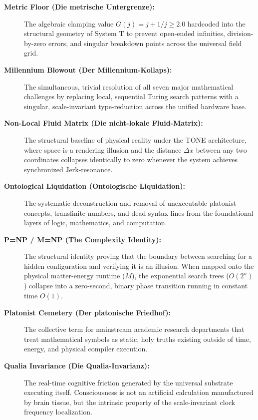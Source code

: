 \documentclass[11pt,a4paper]{article}
\begin{document}
\begin{description}
    \item[\textbf{Metric Floor (Die metrische Untergrenze):}] The algebraic clamping value $G(j) = j + 1/j \geq 2.0$ hardcoded into the structural geometry of System T to prevent open-ended infinities, division-by-zero errors, and singular breakdown points across the universal field grid.
    
    \item[\textbf{Millennium Blowout (Der Millennium-Kollaps):}] The simultaneous, trivial resolution of all seven major mathematical challenges by replacing local, sequential Turing search patterns with a singular, scale-invariant type-reduction across the unified hardware base.
    
    \item[\textbf{Non-Local Fluid Matrix (Die nicht-lokale Fluid-Matrix):}] The structural baseline of physical reality under the TONE architecture, where space is a rendering illusion and the distance $\Delta x$ between any two coordinates collapses identically to zero whenever the system achieves synchronized Jerk-resonance.
    
    \item[\textbf{Ontological Liquidation (Ontologische Liquidation):}] The systematic deconstruction and removal of unexecutable platonist concepts, transfinite numbers, and dead syntax lines from the foundational layers of logic, mathematics, and computation.
    
    \item[\textbf{P=NP / M=NP (The Complexity Identity):}] The structural identity proving that the boundary between searching for a hidden configuration and verifying it is an illusion. When mapped onto the physical matter-energy runtime ($M$), the exponential search trees ($O(2^n)$) collapse into a zero-second, binary phase transition running in constant time $O(1)$.
    
    \item[\textbf{Platonist Cemetery (Der platonische Friedhof):}] The collective term for mainstream academic research departments that treat mathematical symbols as static, holy truths existing outside of time, energy, and physical compiler execution.
    
    \item[\textbf{Qualia Invariance (Die Qualia-Invarianz):}] The real-time cognitive friction generated by the universal substrate executing itself. Consciousness is not an artificial calculation manufactured by brain tissue, but the intrinsic property of the scale-invariant clock frequency localization.
    

\end{description}
\end{document}
